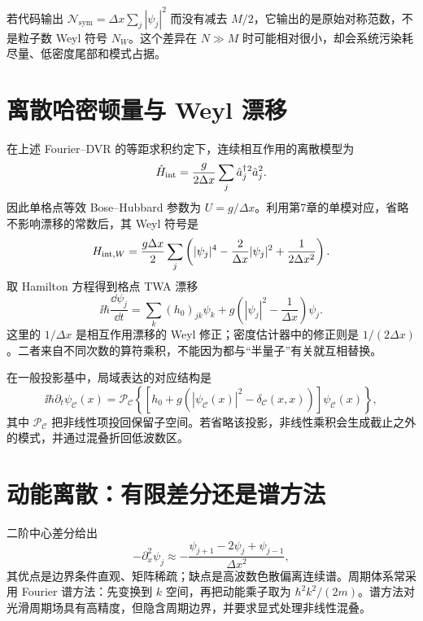 \begin{warningbox}
若代码输出 $\mathcal N_{\mathrm{sym}}=\Delta x\sum_j|\psi_j|^2$ 而没有减去
$M/2$，它输出的是原始对称范数，不是粒子数 Weyl 符号 $N_W$。这个差异在
$N\gg M$ 时可能相对很小，却会系统污染耗尽量、低密度尾部和模式占据。
\end{warningbox}

\section{离散哈密顿量与 Weyl 漂移}

在上述 Fourier--DVR 的等距求积约定下，连续相互作用的离散模型为
\begin{equation}
  \hat H_{\rm int}=\frac{g}{2\Delta x}\sum_j\hat a^{\dagger}_j{}^2\hat a_j^2.
  \label{eq:grid-interaction-hamiltonian}
\end{equation}
因此单格点等效 Bose--Hubbard 参数为 $U=g/\Delta x$。利用第7章的单模对应，省略不影响漂移的常数后，其 Weyl 符号是
\begin{equation}
  H_{{\rm int},W}
  =\frac{g\Delta x}{2}\sum_j
  \left(
  |\psi_j|^4-\frac{2}{\Delta x}|\psi_j|^2
  +\frac{1}{2\Delta x^2}
  \right).
  \label{eq:grid-interaction-weyl}
\end{equation}
取 Hamilton 方程得到格点 TWA 漂移
\begin{equation}
  \ii\hbar\frac{\dd\psi_j}{\dd t}
  =\sum_k (h_0)_{jk}\psi_k
  +g\left(|\psi_j|^2-\frac{1}{\Delta x}\right)\psi_j.
  \label{eq:grid-twa-equation}
\end{equation}
这里的 $1/\Delta x$ 是相互作用漂移的 Weyl 修正；密度估计器中的修正则是 $1/(2\Delta x)$。二者来自不同次数的算符乘积，不能因为都与“半量子”有关就互相替换。

在一般投影基中，局域表达的对应结构是
\begin{equation}
  \ii\hbar\partial_t\psi_{\mathcal C}(x)
  =\mathcal P_{\mathcal C}\!\left\{
  \left[h_0+g\left(|\psi_{\mathcal C}(x)|^2
  -\delta_{\mathcal C}(x,x)\right)\right]
  \psi_{\mathcal C}(x)\right\},
  \label{eq:projected-twa-equation}
\end{equation}
其中 $\mathcal P_{\mathcal C}$ 把非线性项投回保留子空间。若省略该投影，非线性乘积会生成截止之外的模式，并通过混叠折回低波数区。

\section{动能离散：有限差分还是谱方法}

二阶中心差分给出
\begin{equation}
  -\partial_x^2\psi_j\approx
  -\frac{\psi_{j+1}-2\psi_j+\psi_{j-1}}{\Delta x^2},
  \label{eq:finite-difference-laplacian}
\end{equation}
其优点是边界条件直观、矩阵稀疏；缺点是高波数色散偏离连续谱。周期体系常采用 Fourier 谱方法：先变换到 $k$ 空间，再把动能乘子取为 $\hbar^2k^2/(2m)$。谱方法对光滑周期场具有高精度，但隐含周期边界，并要求显式处理非线性混叠。

